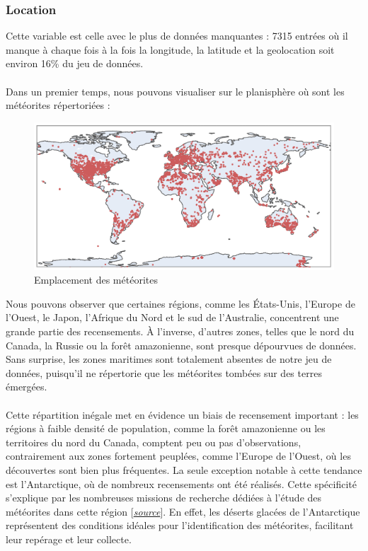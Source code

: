 \documentclass[12pt]{article}
\begin{document}
\subsubsection*{Location}
Cette variable est celle avec le plus de données manquantes : 7315 entrées où il manque à chaque fois à la fois la longitude, la latitude et la geolocation soit environ 16\% du jeu de données.\\
\\
Dans un premier temps, nous pouvons visualiser sur le planisphère où sont les météorites répertoriées :\\
\begin{figure}[H]
\centering
\includegraphics[width=14cm]{Images/exploration/points_monde.png}
\caption{Emplacement des météorites}
\end{figure}
Nous pouvons observer que certaines régions, comme les États-Unis, l’Europe de l’Ouest, le Japon, l’Afrique du Nord et le sud de l’Australie, concentrent une grande partie des recensements. À l’inverse, d’autres zones, telles que le nord du Canada, la Russie ou la forêt amazonienne, sont presque dépourvues de données. Sans surprise, les zones maritimes sont totalement absentes de notre jeu de données, puisqu’il ne répertorie que les météorites tombées sur des terres émergées.\\
\\
Cette répartition inégale met en évidence un biais de recensement important : les régions à faible densité de population, comme la forêt amazonienne ou les territoires du nord du Canada, comptent peu ou pas d’observations, contrairement aux zones fortement peuplées, comme l’Europe de l’Ouest, où les découvertes sont bien plus fréquentes. La seule exception notable à cette tendance est l’Antarctique, où de nombreux recensements ont été réalisés. Cette spécificité s’explique par les nombreuses missions de recherche dédiées à l’étude des météorites dans cette région [\href{https://caslabs.case.edu/ansmet/faqs/}{\textit{source}}]. En effet, les déserts glacées de l’Antarctique représentent des conditions idéales pour l’identification des météorites, facilitant leur repérage et leur collecte.\\
\end{document}
